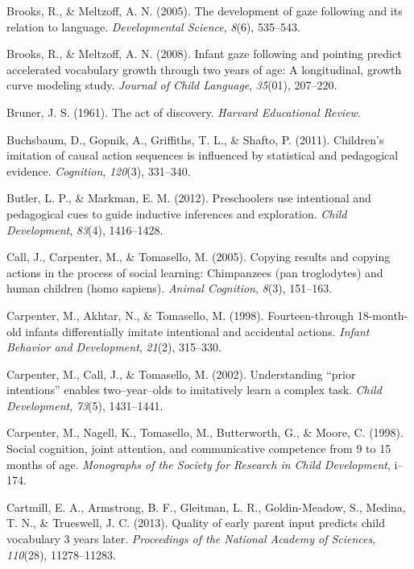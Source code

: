 \documentclass[oneside]{report}
\begin{document}
\hypertarget{ref-brooks2005development}{}
Brooks, R., \& Meltzoff, A. N. (2005). The development of gaze following
and its relation to language. \emph{Developmental Science}, \emph{8}(6),
535--543.

\hypertarget{ref-brooks2008infant}{}
Brooks, R., \& Meltzoff, A. N. (2008). Infant gaze following and
pointing predict accelerated vocabulary growth through two years of age:
A longitudinal, growth curve modeling study. \emph{Journal of Child
Language}, \emph{35}(01), 207--220.

\hypertarget{ref-bruner1961act}{}
Bruner, J. S. (1961). The act of discovery. \emph{Harvard Educational
Review}.

\hypertarget{ref-buchsbaum2011children}{}
Buchsbaum, D., Gopnik, A., Griffiths, T. L., \& Shafto, P. (2011).
Children's imitation of causal action sequences is influenced by
statistical and pedagogical evidence. \emph{Cognition}, \emph{120}(3),
331--340.

\hypertarget{ref-butler2012preschoolers}{}
Butler, L. P., \& Markman, E. M. (2012). Preschoolers use intentional
and pedagogical cues to guide inductive inferences and exploration.
\emph{Child Development}, \emph{83}(4), 1416--1428.

\hypertarget{ref-call2005copying}{}
Call, J., Carpenter, M., \& Tomasello, M. (2005). Copying results and
copying actions in the process of social learning: Chimpanzees (pan
troglodytes) and human children (homo sapiens). \emph{Animal Cognition},
\emph{8}(3), 151--163.

\hypertarget{ref-carpenter1998fourteen}{}
Carpenter, M., Akhtar, N., \& Tomasello, M. (1998). Fourteen-through
18-month-old infants differentially imitate intentional and accidental
actions. \emph{Infant Behavior and Development}, \emph{21}(2), 315--330.

\hypertarget{ref-carpenter2002understanding}{}
Carpenter, M., Call, J., \& Tomasello, M. (2002). Understanding ``prior
intentions'' enables two--year--olds to imitatively learn a complex
task. \emph{Child Development}, \emph{73}(5), 1431--1441.

\hypertarget{ref-carpenter1998social}{}
Carpenter, M., Nagell, K., Tomasello, M., Butterworth, G., \& Moore, C.
(1998). Social cognition, joint attention, and communicative competence
from 9 to 15 months of age. \emph{Monographs of the Society for Research
in Child Development}, i--174.

\hypertarget{ref-cartmill2013quality}{}
Cartmill, E. A., Armstrong, B. F., Gleitman, L. R., Goldin-Meadow, S.,
Medina, T. N., \& Trueswell, J. C. (2013). Quality of early parent input
predicts child vocabulary 3 years later. \emph{Proceedings of the
National Academy of Sciences}, \emph{110}(28), 11278--11283.
\end{document}
